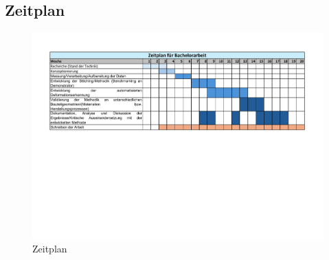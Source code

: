 \documentclass[../main.tex]{subfiles}
\begin{document}
\subsection*{Zeitplan}

\begin{figure}[h]
    \centering
    \includegraphics[width=\textwidth]{Zeitplan.pdf}
    \caption[short]{Zeitplan}
\end{figure}
\end{document}
